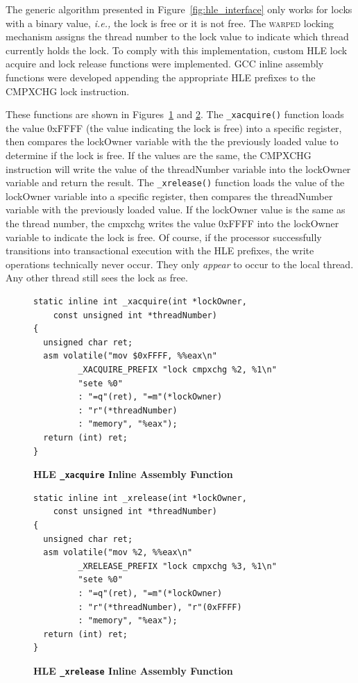 \documentclass{sig-alternate}
\begin{document}
The generic algorithm presented in Figure~\ref{fig:hle_interface} only works for locks
with a binary value, \emph{i.e.,} the lock is free or it is not free.  The \textsc{warped}
locking mechanism assigns the thread number to the lock value to indicate which thread
currently holds the lock.  To comply with this implementation, custom HLE lock acquire and
lock release functions were implemented.  GCC inline assembly functions were developed
appending the appropriate HLE prefixes to the CMPXCHG lock instruction.

These functions are shown in Figures~\ref{hle_inline_xacquire} and
\ref{hle_inline_xrelease}.  The \texttt{\_xacquire()} function loads the value 0xFFFF (the
value indicating the lock is free) into a specific register, then compares the lockOwner
variable with the the previously loaded value to determine if the lock is free.  If the
values are the same, the CMPXCHG instruction will write the value of the threadNumber
variable into the lockOwner variable and return the result.  The \texttt{\_xrelease()}
function loads the value of the lockOwner variable into a specific register, then compares
the threadNumber variable with the previously loaded value.  If the lockOwner value is the
same as the thread number, the cmpxchg writes the value 0xFFFF into the lockOwner variable
to indicate the lock is free.  Of course, if the processor successfully transitions into
transactional execution with the HLE prefixes, the write operations technically never
occur.  They only \emph{appear} to occur to the local thread. Any other thread still sees
the lock as free.

\begin{figure}
\begin{verbatim}
static inline int _xacquire(int *lockOwner, 
    const unsigned int *threadNumber)
{
  unsigned char ret;
  asm volatile("mov $0xFFFF, %%eax\n"
         _XACQUIRE_PREFIX "lock cmpxchg %2, %1\n" 
         "sete %0"
         : "=q"(ret), "=m"(*lockOwner)
         : "r"(*threadNumber) 
         : "memory", "%eax");
  return (int) ret;
}
\end{verbatim}
\caption{\textbf{HLE \texttt{\_xacquire} Inline Assembly Function}}\label{hle_inline_xacquire}
\end{figure}

\begin{figure}
\begin{verbatim}
static inline int _xrelease(int *lockOwner, 
    const unsigned int *threadNumber)
{
  unsigned char ret;
  asm volatile("mov %2, %%eax\n"
         _XRELEASE_PREFIX "lock cmpxchg %3, %1\n"
         "sete %0"
         : "=q"(ret), "=m"(*lockOwner)
         : "r"(*threadNumber), "r"(0xFFFF)
         : "memory", "%eax");
  return (int) ret;
}
\end{verbatim}
\caption{\textbf{HLE \texttt{\_xrelease} Inline Assembly Function}}\label{hle_inline_xrelease}
\end{figure}
\end{document}
